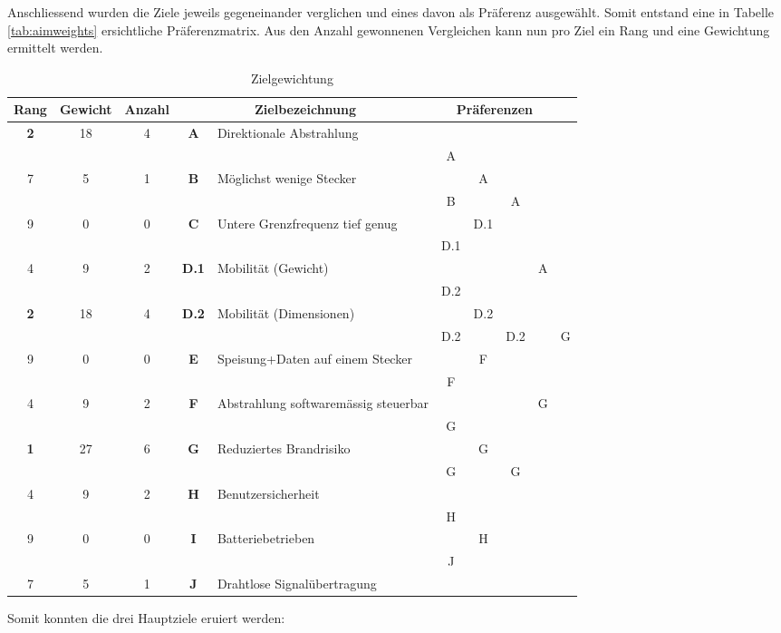 Anschliessend wurden die Ziele jeweils gegeneinander verglichen und eines davon als Präferenz ausgewählt. Somit entstand eine in Tabelle \ref{tab:aimweights} ersichtliche Präferenzmatrix. Aus den Anzahl gewonnenen Vergleichen kann nun pro Ziel ein Rang und eine Gewichtung ermittelt werden.
\begin{table}[!ht]
	\centering
	\begin{tabularx}{\textwidth}{cccclccccc}
		\toprule
		\textbf{Rang} & \textbf{Gewicht} & \textbf{Anzahl} & \multicolumn{2}{c}{\textbf{Zielbezeichnung}} & \multicolumn{4}{c}{\textbf{Präferenzen}} \\ \midrule
		\textbf{2} & 18 & 4 & \textbf{A} & Direktionale Abstrahlung & ~ & ~ & ~ & ~ & ~ \\ 
		\textbf{} & ~ & ~ & ~ & ~ & A & ~ & ~ & ~ & ~ \\ 
		7 & 5 & 1 & \textbf{B} & Möglichst wenige Stecker & ~ & A & ~ & ~ & ~ \\ 
		\textbf{} & ~ & ~ & ~ & ~ & B & ~ & A & ~ & ~ \\ 
		9 & 0 & 0 & \textbf{C} & Untere Grenzfrequenz tief genug & ~ & D.1 & ~ & ~ & ~ \\ 
		\textbf{} & ~ & ~ & ~ & ~ & D.1 & ~ & ~ & ~ & ~ \\ 
		4 & 9 & 2 & \textbf{D.1} & Mobilität (Gewicht) & ~ & ~ & ~ & A & ~ \\ 
		\textbf{} & ~ & ~ & ~ & ~ & D.2 & ~ & ~ & ~ & ~ \\ 
		\textbf{2} & 18 & 4 & \textbf{D.2} & Mobilität (Dimensionen) & ~ & D.2 & ~ & ~ & ~ \\ 
		\textbf{} & ~ & ~ & ~ & ~ & D.2 & ~ & D.2 & ~ & G \\ 
		9 & 0 & 0 & \textbf{E} & Speisung+Daten auf einem Stecker & ~ & F & ~ & ~ & ~ \\ 
		\textbf{} & ~ & ~ & ~ & ~ & F & ~ & ~ & ~ & ~ \\ 
		4 & 9 & 2 & \textbf{F} & Abstrahlung softwaremässig steuerbar & ~ & ~ & ~ & G & ~ \\ 
		\textbf{} & ~ & ~ & ~ & ~ & G & ~ & ~ & ~ & ~ \\ 
		\textbf{1} & 27 & 6 & \textbf{G} & Reduziertes Brandrisiko & ~ & G & ~ & ~ & ~ \\ 
		\textbf{} & ~ & ~ & ~ & ~ & G & ~ & G & ~ & ~ \\ 
		4 & 9 & 2 & \textbf{H} & Benutzersicherheit & ~ & ~ & ~ & ~ & ~ \\ 
		\textbf{} & ~ & ~ & ~ & ~ & H & ~ & ~ & ~ & ~ \\ 
		9 & 0 & 0 & \textbf{I} &  Batteriebetrieben & ~ & H & ~ & ~ & ~ \\ 
		\textbf{} & ~ & ~ & ~ & ~ & J & ~ & ~ & ~ & ~ \\ 
		7 & 5 & 1 & \textbf{J} &  Drahtlose Signalübertragung & ~ & ~ & ~ & ~ & ~ \\ 
		\bottomrule
	\end{tabularx}
	\caption{Zielgewichtung}
	\label{tab:zielgewichtung}
\end{table}
Somit konnten die drei Hauptziele eruiert werden:
